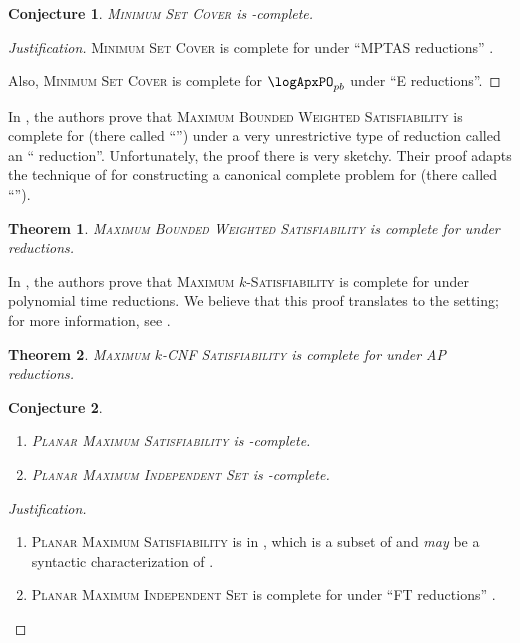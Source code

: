 \documentclass[]{article}
\theoremstyle{plain}
\newtheorem{conjecture}{Conjecture}
\newtheorem{theorem}{Theorem}
\theoremstyle{definition}
\newenvironment{justification}{\begin{proof}[Justification]}{\end{proof}}
\begin{document}
\begin{conjecture}
  \textsc{Minimum Set Cover} is \logApxNCO-complete.
\end{conjecture}
\begin{justification}
  \textsc{Minimum Set Cover} is complete for \logApxPO{} under ``MPTAS reductions'' \cite[Example~2.48]{cks01} \cite[Theorem~5]{ep06} \cite[Theorem~27]{ep10}.

  Also, \textsc{Minimum Set Cover} is complete for $\logApxPO_{pb}$ under ``E reductions''.
\end{justification}

In \cite{sx95}, the authors prove that \textsc{Maximum Bounded Weighted Satisfiability} is complete for \ApxNCO{} (there called ``\NCX'') under a very unrestrictive type of reduction called an ``\NCAS{} reduction''.
Unfortunately, the proof there is very sketchy.
Their proof adapts the technique of \cite{cp91} for constructing a canonical complete problem for \ApxPO{} (there called ``\APX'').

\begin{theorem}
  \textsc{Maximum Bounded Weighted Satisfiability} is complete for \ApxNCO{} under \NCAS{} reductions.
\end{theorem}

In \cite[Theorem~8.6]{acgkmp99}, the authors prove that \textsc{Maximum $k$-Satisfiability} is complete for \ApxPO{} under polynomial time \AP{} reductions.
We believe that this proof translates to the \NC{} setting; for more information, see \cite{finkelstein13b}.

\begin{theorem}{\cite{finkelstein13b}}
  \textsc{Maximum $k$-CNF Satisfiability} is complete for \ApxNCO{} under \NC{} AP reductions.
\end{theorem}

\begin{conjecture}
  \mbox{}
  \begin{enumerate}
  \item \textsc{Planar Maximum Satisfiability} is \NCAS-complete.
  \item \textsc{Planar Maximum Independent Set} is \NCAS-complete.
  \end{enumerate}
\end{conjecture}
\begin{justification}
  \mbox{}
  \begin{enumerate}
  \item \textsc{Planar Maximum Satisfiability} is in \PMPSAT, which is a subset of \PTAS{} and \emph{may} be a syntactic characterization of \PTAS{} \cite{km96}.
  \item \textsc{Planar Maximum Independent Set} is complete for \PTAS{} under ``FT reductions'' \cite[Theorem~6]{bep06}. \qedhere
  \end{enumerate}
\end{justification}
\end{document}

